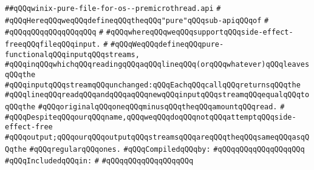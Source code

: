 \label{src/lib/std/src/io/winix-pure-file-for-os--premicrothread.api}
\verb|##qQQqwinix-pure-file-for-os--premicrothread.api|\newline
\verb|#|\newline
\verb|#qQQqHereqQQqweqQQqdefineqQQqtheqQQq"pure"qQQqsub-apiqQQqof|\newline
\verb|#|\newline
\verb|#qQQqqQQqqQQqqQQqqQQq|\newline
\verb|#|\newline
\verb|#qQQqwhereqQQqweqQQqsupportqQQqside-effect-freeqQQqfileqQQqinput.|\newline
\verb|#|\newline
\verb|#qQQqWeqQQqdefineqQQqpure-functionalqQQqinputqQQqstreams,|\newline
\verb|#qQQqinqQQqwhichqQQqreadingqQQqaqQQqlineqQQq(orqQQqwhatever)qQQqleavesqQQqthe|\newline
\verb|#qQQqinputqQQqstreamqQQqunchanged:qQQqEachqQQqcallqQQqreturnsqQQqthe|\newline
\verb|#qQQqlineqQQqreadqQQqandqQQqaqQQqnewqQQqinputqQQqstreamqQQqequalqQQqtoqQQqthe|\newline
\verb|#qQQqoriginalqQQqoneqQQqminusqQQqtheqQQqamountqQQqread.|\newline
\verb|#|\newline
\verb|#qQQqDespiteqQQqourqQQqname,qQQqweqQQqdoqQQqnotqQQqattemptqQQqside-effect-free|\newline
\verb|#qQQqoutput;qQQqourqQQqoutputqQQqstreamsqQQqareqQQqtheqQQqsameqQQqasqQQqthe|\newline
\verb|#qQQqregularqQQqones.|\newline
\newline
\verb|#qQQqCompiledqQQqby:|\newline
\verb|#qQQqqQQqqQQqqQQqqQQq|\newline
\newline
\verb|#qQQqIncludedqQQqin:|\newline
\verb|#|\newline
\verb|#qQQqqQQqqQQqqQQqqQQq|\newline
\newline
